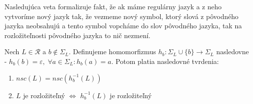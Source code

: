 Nasledujúca veta formalizuje fakt, že ak máme regulárny jazyk a z neho vytvoríme nový jazyk tak, že vezmeme nový symbol, ktorý slová z pôvodného jazyka neobsahujú a tento symbol \glqq{} vopcháme \grqq{} do slov pôvodného jazyka, tak na rozložiteľnosti pôvodného jazyka to nič nezmení.

\begin{theorem}
\label{thm:new_symbol_in_language}
Nech $ L \in \mathscr{R} $ a $ b \notin \Sigma_L $. Definujeme homomorfizmus $ h_b: \Sigma_L \cup \lbrace b \rbrace \rightarrow \Sigma_L $ nasledovne - $ h_b(b) = \varepsilon, \; \forall a \in \Sigma_L: h_b(a) = a $. Potom platia nasledovné tvrdenia:
\begin{enumerate}[label=(\alph*)]
\item \label{thm:new_symbol_in_language_item_1} $ nsc(L) = nsc(h_{b}^{-1}(L)) $
\item \label{thm:new_symbol_in_language_item_2} $ L $ je rozložiteľný $ \Leftrightarrow $ $ h_{b}^{-1}(L) $ je rozložiteľný
\end{enumerate}
\end{theorem}

